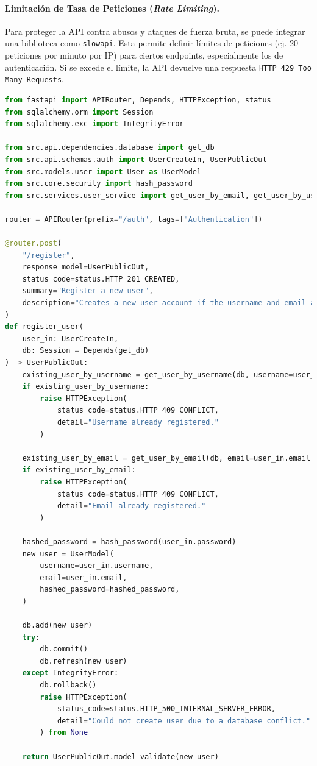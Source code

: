 \paragraph{Limitación de Tasa de Peticiones (\emph{Rate Limiting}).}
Para proteger la API contra abusos y ataques de fuerza bruta, se puede integrar una biblioteca como \texttt{slowapi}. Esta permite definir límites de peticiones (ej. 20 peticiones por minuto por IP) para ciertos endpoints, especialmente los de autenticación. Si se excede el límite, la API devuelve una respuesta \texttt{HTTP 429 Too Many Requests}.

\clearpage
\begin{lstlisting}[language=python,
                   caption={Controlador para el registro de usuarios (\texttt{src/api/routes/auth.py} - extracto).},
                   label={lst:desarrollo_register_controller}, % Label actualizada
                   basicstyle=\fontsize{8}{9.5}\ttfamily]
from fastapi import APIRouter, Depends, HTTPException, status
from sqlalchemy.orm import Session
from sqlalchemy.exc import IntegrityError

from src.api.dependencies.database import get_db
from src.api.schemas.auth import UserCreateIn, UserPublicOut
from src.models.user import User as UserModel
from src.core.security import hash_password
from src.services.user_service import get_user_by_email, get_user_by_username

router = APIRouter(prefix="/auth", tags=["Authentication"])

@router.post(
    "/register",
    response_model=UserPublicOut,
    status_code=status.HTTP_201_CREATED,
    summary="Register a new user",
    description="Creates a new user account if the username and email are not already taken."
)
def register_user(
    user_in: UserCreateIn,
    db: Session = Depends(get_db)
) -> UserPublicOut:
    existing_user_by_username = get_user_by_username(db, username=user_in.username)
    if existing_user_by_username:
        raise HTTPException(
            status_code=status.HTTP_409_CONFLICT,
            detail="Username already registered."
        )

    existing_user_by_email = get_user_by_email(db, email=user_in.email)
    if existing_user_by_email:
        raise HTTPException(
            status_code=status.HTTP_409_CONFLICT,
            detail="Email already registered."
        )

    hashed_password = hash_password(user_in.password)
    new_user = UserModel(
        username=user_in.username,
        email=user_in.email,
        hashed_password=hashed_password,
    )
    
    db.add(new_user)
    try:
        db.commit()
        db.refresh(new_user)
    except IntegrityError:
        db.rollback()
        raise HTTPException(
            status_code=status.HTTP_500_INTERNAL_SERVER_ERROR,
            detail="Could not create user due to a database conflict."
        ) from None

    return UserPublicOut.model_validate(new_user)
\end{lstlisting}

